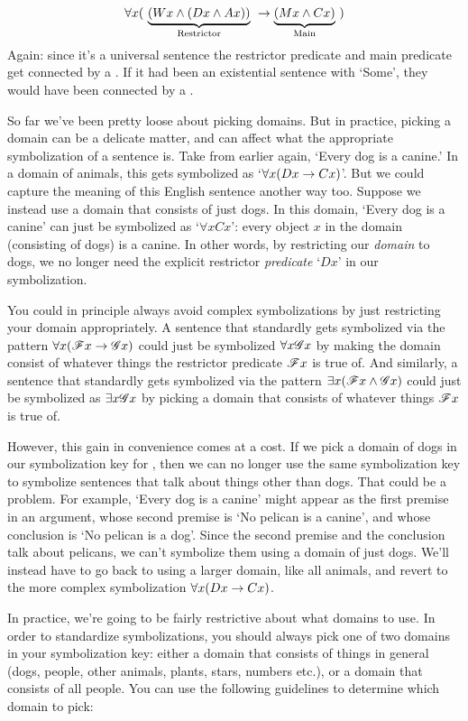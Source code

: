 $$\forall x(\ \underbrace{(Wx \wedge (Dx \wedge Ax))}_{\text{Restrictor}} \ \rightarrow  \underbrace{(Mx \wedge Cx)}_{\text{Main}} \ )$$
Again: since it's a universal sentence the restrictor predicate and main predicate get connected by a \eif.  If it had been an existential sentence with `Some', they would have been connected by a \eand.

So far we've been pretty loose about picking domains.  But in practice, picking a domain can be a delicate matter, and can affect what the appropriate symbolization of a sentence is.  Take  from earlier again, `Every dog is a canine.'  In a domain of animals, this gets symbolized as `$\forall x (Dx \rightarrow Cx)$'.  But we could capture the meaning of this English sentence another way too.  Suppose we instead use a domain that consists of just dogs.  In this domain, `Every dog is a canine' can just be symbolized as `$\forall xCx$': every object $x$ in the domain (consisting of dogs) is a canine.  In other words, by restricting our \emph{domain} to dogs, we no longer need the explicit restrictor \emph{predicate} `$Dx$' in our symbolization.


You could in principle always avoid complex symbolizations by just restricting your domain appropriately.  A sentence that standardly gets symbolized via the pattern $\forall x (\mathscr{F}x \rightarrow \mathscr{G}x)$ could just be symbolized $\forall x \mathscr{G}x$ by making the domain consist of whatever things the restrictor predicate $\mathscr{F}x$ is true of.  And similarly, a sentence that standardly gets symbolized via the pattern $\exists x (\mathscr{F}x \wedge \mathscr{G}x)$ could just be symbolized as $\exists x \mathscr{G}x$ by picking a domain that consists of whatever things $\mathscr{F}x$ is true of.

However, this gain in convenience comes at a cost.  If we pick a domain of dogs in our symbolization key for , then we can no longer use the same symbolization key to symbolize sentences that talk about things other than dogs.  That could be a problem.  For example, `Every dog is a canine' might appear as the first premise in an argument, whose second premise is `No pelican is a canine', and whose conclusion is `No pelican is a dog'.  Since the second premise and the conclusion talk about pelicans, we can't symbolize them using a domain of just dogs.  We'll instead have to go back to using a larger domain, like all animals, and revert to the more complex symbolization  $\forall x (Dx \rightarrow Cx)$.

In practice, we're going to be fairly restrictive about what domains to use.  In order to standardize symbolizations, you should always pick one of two domains in your symbolization key: either a domain that consists of things in general (dogs, people, other animals, plants, stars, numbers etc.), or a domain that consists of all people.  You can use the following guidelines to determine which domain to pick:

